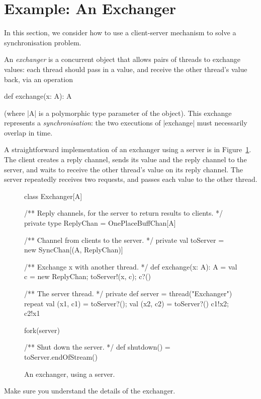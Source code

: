 \section{Example: An Exchanger}
\label{sec:exchanger}

In this section, we consider how to use a client-server mechanism to solve a
synchronisation problem.  

An \emph{exchanger} is a concurrent object that
allows pairs of threads to exchange values: each thread should pass in a
value, and receive the other thread's value back, via an operation
\begin{scala}
  def exchange(x: A): A 
\end{scala}
(where |A| is a polymorphic type parameter of the object).  This exchange
represents a \emph{synchronisation}: the two executions of |exchange| must
necessarily overlap in time.

A straightforward implementation of an exchanger using a server is in
Figure~\ref{fig:exchanger}.  The client creates a reply channel, sends its
value and the reply channel to the server, and waits to receive the other
thread's value on its reply channel.  The server repeatedly receives two
requests, and passes each value to the other thread.


\begin{figure}
\begin{scala}
class Exchanger[A]{
  /** Reply channels, for the server to return results to clients. */
  private type ReplyChan = OnePlaceBuffChan[A]

  /** Channel from clients to the server. */
  private val toServer = new SyncChan[(A, ReplyChan)]

  /** Exchange x with another thread. */
  def exchange(x: A): A = {
    val c = new ReplyChan; toServer!(x, c); c?()
  }

  /** The server thread. */
  private def server = thread("Exchanger"){
    repeat{
      val (x1, c1) = toServer?(); val (x2, c2) = toServer?()
      c1!x2; c2!x1
    }
  }

  fork(server)

  /** Shut down the server. */
  def shutdown() = toServer.endOfStream()
}
\end{scala}
\caption{An exchanger, using a server.}
\label{fig:exchanger}
\end{figure}


\begin{instruction}
Make sure you understand the details of the exchanger.
\end{instruction}

